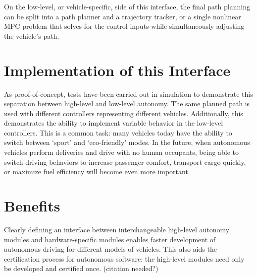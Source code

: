 \documentclass{article}
\begin{document}


On the low-level, or vehicle-specific, side of this interface, the final path planning can be split into a path planner and a trajectory tracker, or a single nonlinear MPC problem that solves for the control inputs while simultaneously adjusting the vehicle's path.

\section*{Implementation of this Interface}
As proof-of-concept, tests have been carried out in simulation to demonstrate this separation between high-level and low-level autonomy. The same planned path is used with different controllers representing different vehicles. Additionally, this demonstrates the ability to implement variable behavior in the low-level controllers. This is a common task: many vehicles today have the ability to switch between `sport' and `eco-friendly' modes. In the future, when autonomous vehicles perform deliveries and drive with no human occupants, being able to switch driving behaviors to increase passenger comfort, transport cargo quickly, or maximize fuel efficiency will become even more important.


\section*{Benefits}
Clearly defining an interface between interchangeable high-level autonomy modules and hardware-specific modules enables faster development of autonomous driving for different models of vehicles. This also aids the certification process for autonomous software: the high-level modules need only be developed and certified once. (citation needed?)
\end{document}
